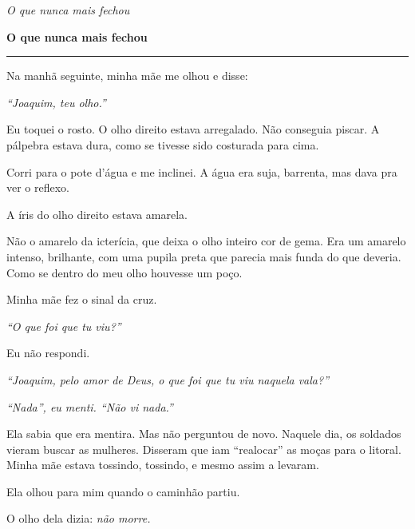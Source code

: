 
\noindent \textit{O que nunca mais fechou}

\noindent \textbf{O que nunca mais fechou}

\vspace{0.5em}\noindent\rule{\textwidth}{0.5pt}\vspace{0.5em}

\noindent Na manhã seguinte, minha mãe me olhou e disse:

\noindent \textit{\textquotedblleft{}Joaquim, teu olho.\textquotedblright{}}

\noindent Eu toquei o rosto. O olho direito estava arregalado. Não conseguia piscar. A pálpebra estava dura, como se tivesse sido costurada para cima.

\noindent Corri para o pote d'água e me inclinei. A água era suja, barrenta, mas dava pra ver o reflexo.

\noindent A íris do olho direito estava amarela.

\noindent Não o amarelo da icterícia, que deixa o olho inteiro cor de gema. Era um amarelo intenso, brilhante, com uma pupila preta que parecia mais funda do que deveria. Como se dentro do meu olho houvesse um poço.

\noindent Minha mãe fez o sinal da cruz.

\noindent \textit{\textquotedblleft{}O que foi que tu viu?\textquotedblright{}}

\noindent Eu não respondi.

\noindent \textit{\textquotedblleft{}Joaquim, pelo amor de Deus, o que foi que tu viu naquela vala?\textquotedblright{}}

\noindent \textit{\textquotedblleft{}Nada\textquotedblright{}\textit{, eu menti. }\textquotedblleft{}Não vi nada.\textquotedblright{}}

\noindent Ela sabia que era mentira. Mas não perguntou de novo. Naquele dia, os soldados vieram buscar as mulheres. Disseram que iam \textquotedblleft{}realocar\textquotedblright{} as moças para o litoral. Minha mãe estava tossindo, tossindo, e mesmo assim a levaram.

\noindent Ela olhou para mim quando o caminhão partiu.

\noindent O olho dela dizia: \textit{não morre.}

